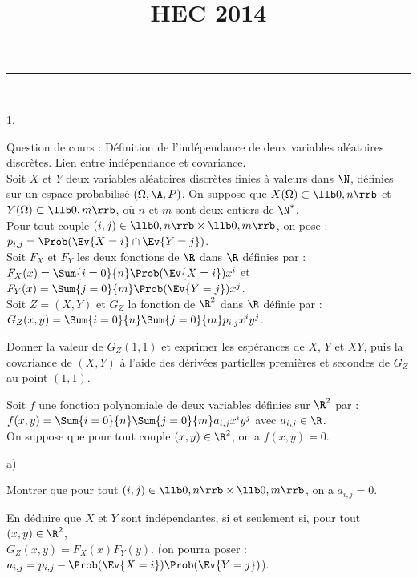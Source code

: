 \documentclass[11pt]{article}%
\title{\bf \vspace{-1.6cm} HEC 2014} %
\author{} %
\date{} %
\begin{document}
\maketitle %
\vspace{-1.2cm}\hrule %
\thispagestyle{fancy}

\vspace*{.2cm}



\begin{exerciceAP}~
  \begin{noliste}{1.}
    \setlength{\itemsep}{2mm}
  \item Question de cours : Définition de l'indépendance de deux
    variables aléatoires discrètes. Lien entre indépendance et
    covariance.\\
    Soit $X$ et $Y$ deux variables aléatoires discrètes finies à
    valeurs dans $\N$, définies sur un espace probabilisé
    $(\Omega,\A,P)$. On suppose que $X(\Omega)\subset \llb0,n\rrb$ et
    $Y(\Omega) \subset \llb 0, m \rrb$, où $n$ et $m$ sont deux
    entiers de $\N^*$.\\
    Pour tout couple $(i,j) \in \llb 0, n \rrb \times \llb 0, m \rrb$,
    on pose : $p_{i,j} = \Prob(\Ev{X=i} \cap \Ev{Y=j})$.\\
    Soit $F_X$ et $F_Y$ les deux fonctions de $\R$ dans $\R$ définies
    par : $F_X(x)=\Sum{i=0}{n} \Prob(\Ev{X=i})x^i$ et \\
    $F_Y(x)=\Sum{j=0}{m} \Prob(\Ev{Y=j})x^j$.\\
    Soit $Z=(X,Y)$ et $G_Z$ la fonction de $\R^2$ dans $\R$ définie
    par : $G_Z(x,y)=\Sum{i=0}{n}\Sum{j=0}{m} p_{i,j}x^iy^j$.

  \item Donner la valeur de $G_Z(1,1)$ et exprimer les espérances de
    $X$, $Y$ et $XY$, puis la covariance de $(X,Y)$ à l'aide des
    dérivées partielles premières et secondes de $G_Z$ au point
    $(1,1)$.

  \item Soit $f$ une fonction polynomiale de deux variables définies
    sur $\R^2$ par : $f(x,y) = \Sum{i=0}{n} \Sum{j=0}{m}
    a_{i,j}x^iy^j$ avec $a_{i,j} \in \R$.\\
    On suppose que pour tout couple $(x,y)\in\R^2$, on a $f(x,y)=0$.
    \begin{noliste}{a)}
    \setlength{\itemsep}{2mm}
  \item Montrer que pour tout $(i,j) \in \llb0, n \rrb \times \llb 0,
    m \rrb$, on a $a_{i,j}=0$.
    \item En déduire que $X$ et $Y$ sont indépendantes, si et
      seulement si, pour tout $(x,y)\in\R^2$,\\
      $G_Z(x,y)=F_X(x)F_Y(y)$. (on pourra poser : $a_{i,j}=p_{i,j} -
      \Prob(\Ev{X=i})\Prob(\Ev{Y=j})$).
    \end{noliste}


\end{noliste}
\end{exerciceAP}
\end{document}
